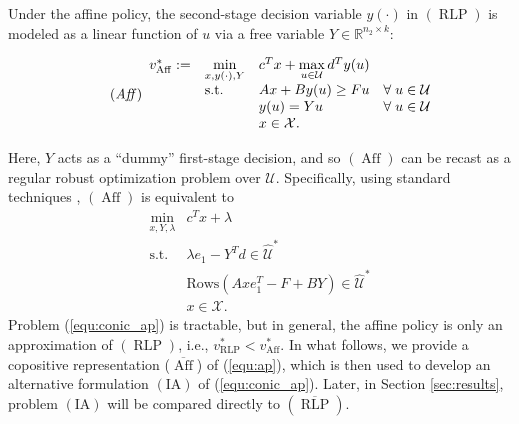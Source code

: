 \documentclass[12pt]{article}
\DeclareMathOperator{\st}{s.t.}
\DeclareMathOperator{\AR}{RLP}
\DeclareMathOperator{\AP}{Aff}
\newcommand{\U}{{\mathcal{U}}}
\newcommand{\K}{\widehat{\mathcal{U}}}
\newcommand{\X}{{\mathcal{X}}}
\newcommand{\M}{\mathrm{IA}}
\def\RR{{\mathbb{R}}}
\begin{document}
\begin{onehalfspace}
Under the affine policy, the second-stage decision variable $y(\cdot)$
in $(\AR)$ is modeled as a linear function of $u$ via a free variable $Y
\in \RR^{n_2 \times k}$:

\begin{equation} \tag{{\em Aff\/}} \label{equ:ap} 
\begin{array}{lll}
v_{\AP}^* := & \min \limits_{x, y(\cdot), Y} & c^Tx + \max \limits_{u \in \U} d^Ty(u) \\
                    & \st    & Ax + By(u) \ge Fu \ \ \ \forall \; u \in \U \\
                    &        & y(u) = Yu \quad\quad\quad\quad \ \forall \; u \in \U \\
                    &        & x \in \X. 
\end{array}
\end{equation}

\noindent Here, $Y$ acts as a ``dummy'' first-stage decision, and so
$(\AP)$ can be recast as a regular robust optimization
problem over $\U$. Specifically, using standard techniques
\cite{Ben-Tal.Goryashko.Guslitzer.Nemirovski.2004}, $(\AP)$ is
equivalent to
\begin{equation} \label{equ:conic_ap}
\begin{array}{ll}
\min \limits_{x,Y,\lambda}  & c^Tx + \lambda \\
 \st & \lambda e_1 - Y^Td \in {\K}^*   \\
      & \text{Rows}(Axe_1^T - F + BY) \in {\K}^* \\
      & x \in \X.
\end{array}
\end{equation}
Problem (\ref{equ:conic_ap}) is tractable, but in general, the affine
policy is only an approximation of $(\AR)$, i.e., $v_{\AR}^* <
v_{\AP}^*$. In what follows, we provide a copositive
representation ($\overline{\AP}$) of (\ref{equ:ap}), which is then used
to develop an alternative formulation $(\M)$ of (\ref{equ:conic_ap}).
Later, in Section \ref{sec:results}, problem $(\M)$ will be compared
directly to $(\overline{\AR})$.



\end{onehalfspace}
\end{document}
